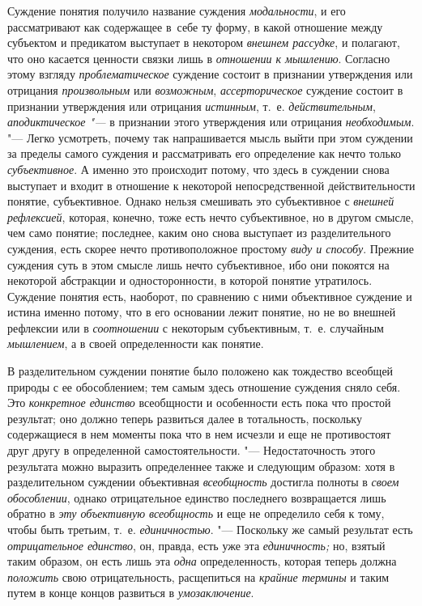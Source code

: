 Суждение понятия получило название суждения
{\em модальности}, и его
рассматривают как содержащее в~себе ту форму, в какой отношение между
субъектом и предикатом выступает в некотором
{\em внешнем рассудке}, и
полагают, что оно касается ценности связки лишь в
{\em отношении к мышлению}.
Согласно этому взгляду
{\em проблематическое}
суждение состоит в признании утверждения или отрицания
{\em произвольным} или
{\em возможным},
{\em ассерторическое}
суждение состоит в признании утверждения или отрицания
{\em истинным}, т.~е.
{\em действительным},
{\em аподиктическое "--- }в
признании этого утверждения или отрицания
{\em необходимым}. "---
Легко усмотреть, почему так напрашивается мысль выйти при
этом суждении за пределы самого суждения и рассматривать его определение
как нечто только {\em субъективное}.
А именно это происходит потому, что здесь в суждении снова
выступает и входит в отношение к некоторой непосредственной
действительности понятие, субъективное. Однако нельзя смешивать это
субъективное с {\em внешней
рефлексией}, которая, конечно, тоже есть нечто субъективное,
но в другом смысле, чем само понятие; последнее, каким оно снова выступает
из разделительного суждения, есть скорее нечто противоположное простому
{\em виду и способу}.
Прежние суждения суть в этом смысле лишь нечто субъективное,
ибо они покоятся на некоторой абстракции и односторонности, в которой
понятие утратилось. Суждение понятия есть, наоборот, по сравнению с ними
объективное суждение и истина именно потому, что в его основании лежит
понятие, но не во внешней рефлексии или в
{\em соотношении} с
некоторым субъективным, т.~е. случайным
{\em мышлением}, а в
своей определенности как понятие.

В разделительном суждении понятие было положено как тождество
всеобщей природы с ее обособлением; тем самым здесь отношение суждения
сняло себя. Это {\em конкретное
единство} всеобщности и особенности есть пока что простой
результат; оно должно теперь развиться далее в тотальность, поскольку
содержащиеся в нем моменты пока что в нем исчезли и еще не противостоят
друг другу в определенной самостоятельности. "---
Недостаточность этого результата можно выразить определеннее
также и следующим образом: хотя в разделительном суждении объективная
{\em всеобщность}
достигла полноты в
{\em своем обособлении},
однако отрицательное единство последнего возвращается лишь
обратно в {\em эту объективную
всеобщность} и еще не определило себя к тому, чтобы быть
третьим, т.~е. {\em единичностью}. "---
Поскольку же самый результат есть
{\em отрицательное единство},
он, правда, есть уже эта
{\em единичность;} но,
взятый таким образом, он есть лишь эта
{\em одна}
определенность, которая теперь должна
{\em положить} свою
отрицательность, расщепиться на
{\em крайние термины} и
таким путем в конце концов развиться в
{\em умозаключение}.

